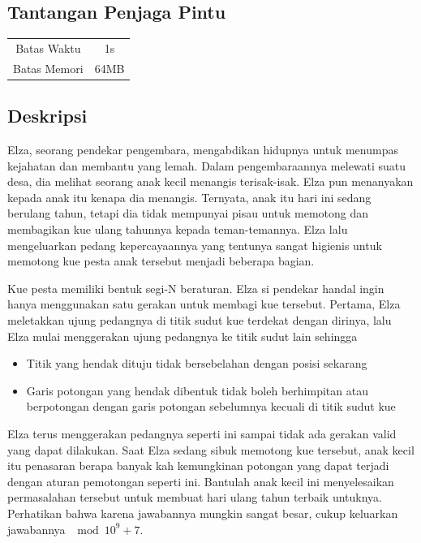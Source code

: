 \documentclass{article}
\begin{document}
\begin{center}
    \section*{Tantangan Penjaga Pintu} %

    \begin{tabular}{ | c c | }
        \hline
        Batas Waktu  & 1s \\    %
        Batas Memori & 64MB \\  %
        \hline
    \end{tabular}
\end{center}

\subsection*{Deskripsi}

Elza, seorang pendekar pengembara, mengabdikan hidupnya untuk menumpas kejahatan dan membantu yang lemah. Dalam pengembaraannya melewati suatu desa, dia melihat seorang anak kecil menangis terisak-isak. Elza pun menanyakan kepada anak itu kenapa dia menangis. Ternyata, anak itu hari ini sedang berulang tahun, tetapi dia tidak mempunyai pisau untuk memotong dan membagikan kue ulang tahunnya kepada teman-temannya. Elza lalu mengeluarkan pedang kepercayaannya yang tentunya sangat higienis untuk memotong kue pesta anak tersebut menjadi beberapa bagian.

Kue pesta memiliki bentuk segi-N beraturan. Elza si pendekar handal ingin hanya menggunakan satu gerakan untuk membagi kue tersebut. Pertama, Elza meletakkan ujung pedangnya di titik sudut kue terdekat dengan dirinya, lalu Elza mulai menggerakan ujung pedangnya ke titik sudut lain sehingga

\begin{itemize}
    \setlength\itemsep{0pt}
    \item Titik yang hendak dituju tidak bersebelahan dengan posisi sekarang
    \item Garis potongan yang hendak dibentuk tidak boleh berhimpitan atau berpotongan dengan garis potongan sebelumnya kecuali di titik sudut kue
\end{itemize}

Elza terus menggerakan pedangnya seperti ini sampai tidak ada gerakan valid yang dapat dilakukan. Saat Elza sedang sibuk memotong kue tersebut, anak kecil itu penasaran berapa banyak kah kemungkinan potongan yang dapat terjadi dengan aturan pemotongan seperti ini. Bantulah anak kecil ini menyelesaikan permasalahan tersebut untuk membuat hari ulang tahun terbaik untuknya. Perhatikan bahwa karena jawabannya mungkin sangat besar, cukup keluarkan jawabannya $\mod 10^9 + 7$.
\end{document}
